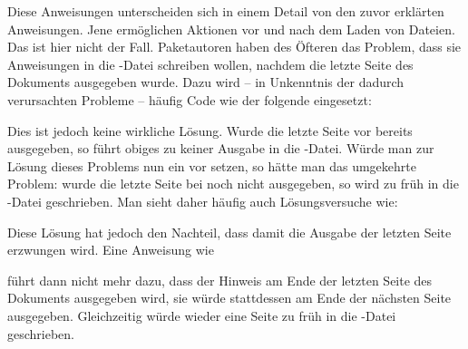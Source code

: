 \begin{Declaration}
\end{Declaration}
Diese Anweisungen unterscheiden sich in einem Detail von den zuvor erklärten
Anweisungen. Jene ermöglichen Aktionen vor und nach dem Laden von
Dateien. Das ist hier nicht der Fall. Paketautoren haben des Öfteren das
Problem, dass sie Anweisungen in die -Datei schreiben wollen,
nachdem die letzte Seite des Dokuments ausgegeben wurde. Dazu wird -- in
Unkenntnis der dadurch verursachten Probleme -- häufig Code
wie der folgende eingesetzt:
\begin{lstcode}[escapechar=\$]
  \AtEndDocument{%
    \if@filesw
      \write\@auxout{%
        \protect\writethistoaux%
      }%
    \fi
  } 
\end{lstcode}
Dies ist jedoch keine wirkliche Lösung. Wurde die letzte
Seite vor  bereits ausgegeben, so führt obiges
zu keiner Ausgabe in die -Datei. Würde man zur Lösung dieses
Problems nun ein  vor  setzen, so hätte man das
umgekehrte Problem: wurde die letzte Seite bei
 noch nicht ausgegeben, so wird
 zu früh in die -Datei geschrieben. Man sieht
daher häufig auch Lösungsversuche wie:
\begin{lstcode}[escapechar=\$]
  \AtEndDocument{%
    \if@filesw
      \clearpage
      \immediate\write\@auxout{%
        \protect\writethistoaux%
      }%
    \fi
  } 
\end{lstcode}
Diese Lösung hat jedoch den Nachteil, dass damit die Ausgabe der letzten Seite
erzwungen wird. Eine Anweisung wie
\begin{lstcode}
\end{lstcode}
führt dann nicht mehr dazu, dass der Hinweis am Ende der letzten Seite des
Dokuments ausgegeben wird, sie würde stattdessen am Ende der nächsten Seite
ausgegeben. Gleichzeitig würde  wieder eine Seite zu
früh in die -Datei geschrieben.

